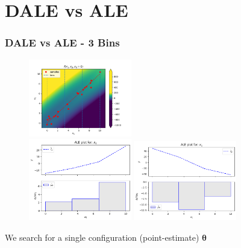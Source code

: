 \documentclass{beamer}
\newcommand{\thetab}{\boldsymbol{\theta}}
\begin{document}
\section{DALE vs ALE}
\begin{frame}
  \frametitle{DALE vs ALE - 3 Bins}
  \begin{figure}[ht]
    \centering
    \includegraphics[width=0.4\textwidth]{./figures/bin_splitting_3_bins.png}\\
    \includegraphics[width=0.4\textwidth]{./figures/dale_3_bins.png}
    \includegraphics[width=0.4\textwidth]{./figures/ale_3_bins.png}
    \label{}
  \end{figure}
  \noindent\makebox[\linewidth]{\rule{\paperwidth}{0.4pt}}
  We search for a \alert{single configuration (point-estimate) \( \hat{\thetab}\) }
\end{frame}
\end{document}
